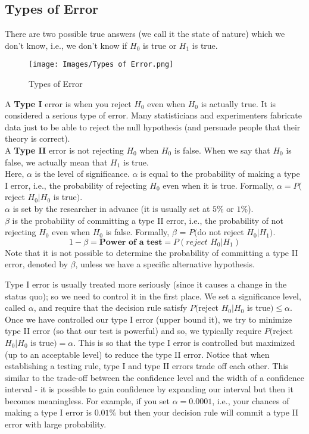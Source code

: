 \subsection{Types of Error}
There are two possible true answers (we call it the state of nature) which we don't know, i.e., we don't know if $H_0$ is true or $H_1$ is true.\\
\begin{figure}[ht]
    \centering
    \texttt{[image: Images/Types of Error.png]}
    \caption{Types of Error}
    \label{fig:my_label}
\end{figure}
A \textbf{Type I} error is when you reject $H_0$ even when $H_0$ is actually true. It is considered a serious type of error. Many statisticians and experimenters fabricate data just to be able to reject the null hypothesis (and persuade people that their theory is correct). \\
A \textbf{Type II} error is not rejecting $H_0$ when $H_0$ is false. When we say that $H_0$ is false, we actually mean that $H_1$ is true. \\
Here, $\alpha$ is the level of significance. $\alpha$ is equal to the probability of making a type I error, i.e., the probability of rejecting $H_0$ even when it is true. Formally, $\alpha = P($reject $H_0|H_0$ is true$)$. \\
$\alpha$ is set by the researcher in advance (it is usually set at $5\%$ or $1\%$). \\
$\beta$ is the probability of committing a type II error, i.e., the probability of not rejecting $H_0$ even when $H_0$ is false. Formally, $\beta$ = $P($do not reject $H_0|H_1)$. \\
$$
1 - \beta = \textbf{Power of a test} = P(\textit{reject }H_0|H_1)
$$
{\color{blue} Note that it is not possible to determine the probability of committing a type II error, denoted by $\beta$, unless we have a specific alternative hypothesis.} \\
\begin{note}
\end{note}
Type I error is usually treated more seriously (since it causes a change in the status quo); so we need to control it in the first place. We set a significance level, called $\alpha$, and require that the decision rule satisfy $P($reject $H_0|H_0$ is true$) \leq \alpha$. Once we have controlled our type I error (upper bound it), we try to minimize type II error (so that our test is powerful) and so, we typically require  $P($reject $H_0|H_0$ is true$) = \alpha$. This is so that the type I error is controlled but maximized (up to an acceptable level) to reduce the type II error. Notice that when establishing a testing rule, type I and type II errors trade off each other. This similar to the trade-off between the confidence level and the width of a confidence interval - it is possible to gain confidence by expanding our interval but then it becomes meaningless. For example, if you set $\alpha = 0.0001$, i.e., your chances of making a type I error is $0.01\%$ but then your decision rule will commit a type II error with large probability.
